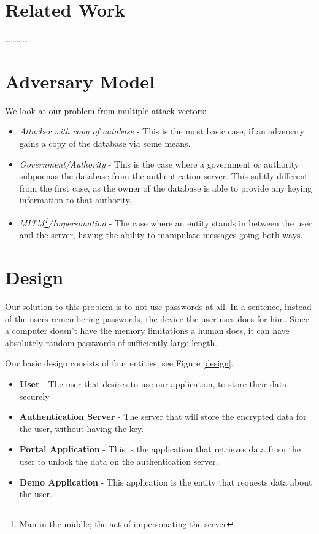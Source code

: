 \documentclass[letterpaper,twocolumn,10pt]{article}
\begin{document}
\section{Related Work}
\dots\dots\dots\dots

\section{Adversary Model}
    We look at our problem from multiple attack vectors:
    \begin{itemize}
    \item \textit{Attacker with copy of aatabase} - This is the most basic case, if an adversary gains a copy of the database via some means.
    \item \textit{Government/Authority} - This is the case where a government or authority subpoenas the database from the authentication server. This subtly different from the first case, as the owner of the database is able to provide any keying information to that authority.
    \item \textit{MITM\footnote{Man in the middle; the act of impersonating the server}/Impersonation} - The case where an entity stands in between the user and the server, having the ability to manipulate messages going both ways.
    \end{itemize}

\section{Design}

Our solution to this problem is to not use passwords at all. In a sentence, instead of the users remembering passwords, the device the user uses does for him. Since a computer doesn't have the memory limitations a human does, it can have absolutely random passwords of sufficiently large length. 

Our basic design consists of four entities; see Figure \ref{design}.
\begin{itemize}
    \item \textbf{User} - The user that desires to use our application, to store their data securely
    \item \textbf{Authentication Server} - The server that will store the encrypted data for the user, without having the key.
    \item \textbf{Portal Application} - This is the application that retrieves data from the user to unlock the data on the authentication server.
    \item \textbf{Demo Application} - This application is the entity that requests data about the user.
\end{itemize}
\end{document}
